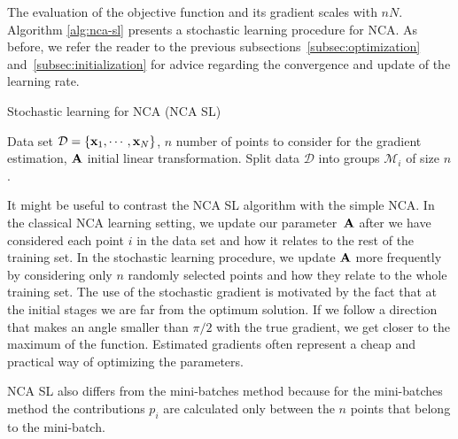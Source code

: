 The evaluation of the objective function and its gradient scales with $nN$. Algorithm \ref{alg:nca-sl} presents a stochastic learning procedure for NCA. As before, we refer the reader to the previous subsections~\ref{subsec:optimization} and~\ref{subsec:initialization} for advice regarding the convergence and update of the learning rate.

	\begin{algorithm} 
		\caption{Stochastic learning for NCA (NCA SL)} 
		\label{alg:nca-sl}  
		\begin{algorithmic}[1]                    
			\REQUIRE Data set $\mathcal{D}=\{\mathbf{x}_1,\cdots,\mathbf{x}_N\}$, $n$ number of points
to consider for the gradient estimation, $\mathbf{A}$ initial linear transformation.
			\REPEAT
				\STATE Split data $\mathcal{D}$ into groups $\mathcal{M}_i$ of size $n$.\
				\ENDFOR
		\end{algorithmic}
	\end{algorithm}

It might be useful to contrast the NCA SL algorithm with the simple NCA. In the classical NCA learning setting, we update our parameter~$\mathbf{A}$
after we have considered each point $i$ in the data set and how it relates to the rest of the training set. In the stochastic
learning procedure, we update $\mathbf{A}$ more frequently by considering only $n$
randomly selected points and how they relate to the whole training set. 
The use of the stochastic gradient is motivated by the fact that at the initial stages we are far from the optimum solution. If we follow a direction that makes an angle smaller than $\pi/2$ with the true gradient, we get closer to the maximum of the function. Estimated gradients often represent a cheap and practical way of optimizing the parameters.

NCA SL also differs from the mini-batches method because for the mini-batches method the contributions $p_i$ are calculated only between the $n$ points that belong to the mini-batch.

